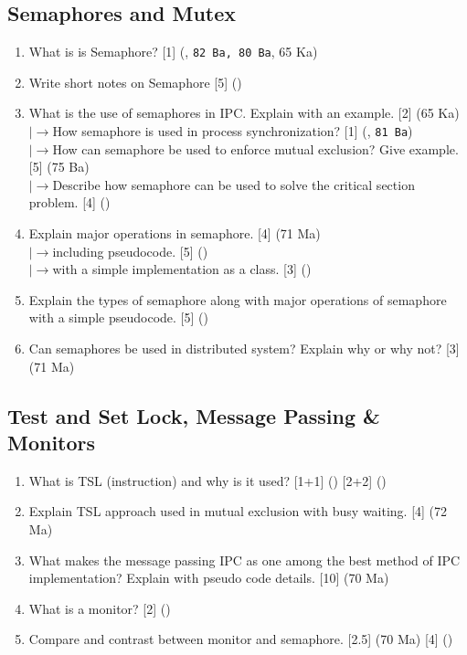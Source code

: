 \documentclass[12pt]{article}
\newcommand{\lb}{\\$\left|\rightarrow\right.$}
\begin{document}
	\subsection{Semaphores and Mutex}
		\begin{enumerate}[topsep=0pt]			
			\item What is is Semaphore? \hfill [1] (, \texttt{82 Ba, 80 Ba}, 65 Ka)

			\item Write short notes on Semaphore \hfill [5] ()
			
			\item What is the use of semaphores in IPC. Explain with an example. \hfill [2] (65 Ka)
			\lb How semaphore is used in process synchronization? \hfill [1] (, \texttt{81 Ba})
			\lb How can semaphore be used to enforce mutual exclusion? Give example. \hfill [5] (75 Ba)
			\lb Describe how semaphore can be used to solve the critical section problem. \hfill [4] ()
			
			\item Explain major operations in semaphore. \hfill [4] (71 Ma)
			\lb including pseudocode. \hfill [5] ()			
			\lb with a simple implementation as a class. \hfill [3] ()
			
			\item Explain the types of semaphore along with major operations of semaphore with a simple pseudocode. \hfill [5] ()
			
			\item Can semaphores be used in distributed system? Explain why or why not? \hfill [3] (71 Ma)
		\end{enumerate}
		
	\subsection{Test and Set Lock, Message Passing \& Monitors}
		\begin{enumerate}[topsep=0pt]
			\item What is TSL (instruction) and why is it used? \hfill [1+1] () [2+2] ()
			
			\item Explain TSL approach used in mutual exclusion with busy waiting. \hfill [4] (72 Ma)
			
			\item What makes the message passing IPC as one among the best method of IPC implementation? Explain with pseudo code details. \hfill [10] (70 Ma)
			
			\item What is a monitor? \hfill [2] ()
			
			\item Compare and contrast between monitor and semaphore. \hfill [2.5] (70 Ma) [4] ()
		\end{enumerate}
		
\end{document}
